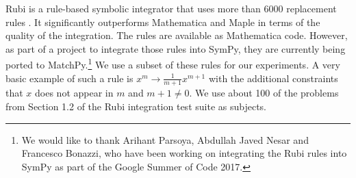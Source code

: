 \documentclass[conference,compsoc]{IEEEtran}
\begin{document}
Rubi is a rule-based symbolic integrator that uses more than 6000 replacement rules \cite{Rich2009}.
It significantly outperforms Mathematica and Maple in terms of the quality of the integration.
The rules are available as Mathematica code. However, as part of a project to integrate those rules into SymPy, they  are currently being ported to MatchPy.\footnote{We would like to thank Arihant Parsoya, Abdullah Javed Nesar and Francesco Bonazzi, who have been working on integrating the Rubi rules into SymPy as part of the Google Summer of Code 2017.} We use a subset of these rules for our experiments.
A very basic example of such a rule is $x^m \rightarrow \frac{1}{m + 1} x^{m + 1}$ with the additional constraints that $x$ does not appear in $m$ and $m + 1 \neq 0$.
We use about 100 of the problems from Section 1.2 of the Rubi integration test suite as subjects.

\rubiraw
\pgfplotstablesort[sort key=one-to-one,sort cmp=float <]\rubiresults{\rubiraw}
\end{document}
